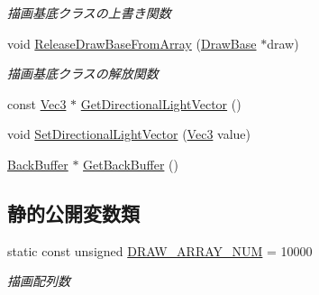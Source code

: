 \begin{DoxyCompactItemize}
\begin{DoxyCompactList}\small\item\em 描画基底クラスの上書き関数 \end{DoxyCompactList}\item 
void \mbox{\hyperlink{class_draw_manager_a287d1f359b87f075b22df6a9b6e99316}{Release\+Draw\+Base\+From\+Array}} (\mbox{\hyperlink{class_draw_base}{Draw\+Base}} $\ast$draw)
\begin{DoxyCompactList}\small\item\em 描画基底クラスの解放関数 \end{DoxyCompactList}\item 
const \mbox{\hyperlink{_vector3_d_8h_ab16f59e4393f29a01ec8b9bbbabbe65d}{Vec3}} $\ast$ \mbox{\hyperlink{class_draw_manager_a952023ad9e2e12844c93e37029a32700}{Get\+Directional\+Light\+Vector}} ()
\item 
void \mbox{\hyperlink{class_draw_manager_a470edae8248d36956a02bab7e59a4140}{Set\+Directional\+Light\+Vector}} (\mbox{\hyperlink{_vector3_d_8h_ab16f59e4393f29a01ec8b9bbbabbe65d}{Vec3}} value)
\item 
\mbox{\hyperlink{class_back_buffer}{Back\+Buffer}} $\ast$ \mbox{\hyperlink{class_draw_manager_a0e7e11e650f1c1736e9d3199a58191a7}{Get\+Back\+Buffer}} ()
\end{DoxyCompactItemize}
\subsection*{静的公開変数類}
\begin{DoxyCompactItemize}
\item 
static const unsigned \mbox{\hyperlink{class_draw_manager_ad4326cddcb1cc4cec198c4f8069b81f0}{D\+R\+A\+W\+\_\+\+A\+R\+R\+A\+Y\+\_\+\+N\+UM}} = 10000
\begin{DoxyCompactList}\small\item\em 描画配列数 \end{DoxyCompactList}\end{DoxyCompactItemize}
